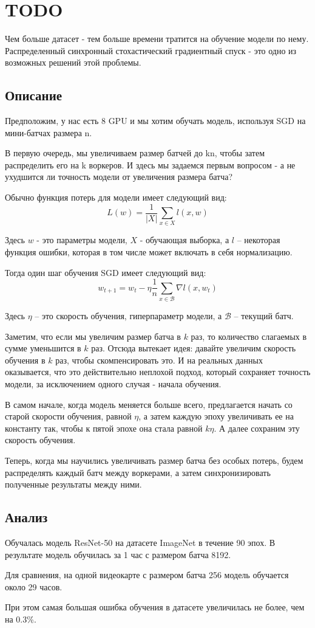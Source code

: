 
\newpage
\section{TODO}

Чем больше датасет - тем больше времени тратится на обучение модели по нему. Распределенный синхронный стохастический градиентный спуск - это одно из возможных решений этой проблемы.

\subsection{Описание}
Предположим, у нас есть 8 GPU и мы хотим обучать модель, используя SGD на мини-батчах размера n.

В первую очередь, мы увеличиваем размер батчей до kn, чтобы затем распределить его на k воркеров.
И здесь мы задаемся первым вопросом - а не ухудшится ли точность модели от увеличения размера батча?

Обычно функция потерь для модели имеет следующий вид:
\[L(w) = \frac{1}{|X|} \sum_{x \in X}^{} l(x, w)\]

Здесь $w$ - это параметры модели, $X$ - обучающая выборка, а $l$ -- некоторая функция ошибки,
которая в том числе может включать в себя нормализацию.

Тогда один шаг обучения SGD имеет следующий вид:
\[w_{t + 1} = w_t - \eta \frac1n \sum_{x \in \mathcal{B}}^{} \nabla l(x, w_t)\]

Здесь $\eta$ -- это скорость обучения, гиперпараметр модели, а $\mathcal{B}$ -- текущий батч.

Заметим, что если мы увеличим размер батча в $k$ раз, то количество слагаемых в сумме уменьшится в
$k$ раз. Отсюда вытекает идея: давайте увеличим скорость обучения в $k$ раз, чтобы скомпенсировать
это. И на реальных данных оказывается, что это действительно неплохой подход, который сохраняет
точность модели, за исключением одного случая - начала обучения.

В самом начале, когда модель меняется больше всего, предлагается начать со старой скорости обучения,
равной $\eta$, а затем каждую эпоху увеличивать ее на константу так, чтобы к пятой эпохе она стала
равной $k \eta$. А далее сохраним эту скорость обучения.

Теперь, когда мы научились увеличивать размер батча без особых потерь, будем распределять каждый
батч между воркерами, а затем синхронизировать полученные результаты между ними.

\subsection{Анализ}

Обучалась модель ResNet-50 на датасете ImageNet в течение 90 эпох. В результате модель обучилась за
1 час с размером батча 8192.

Для сравнения, на одной видеокарте с размером батча 256 модель обучается около 29 часов.

При этом самая большая ошибка обучения в датасете увеличилась не более, чем на 0.3\%.

